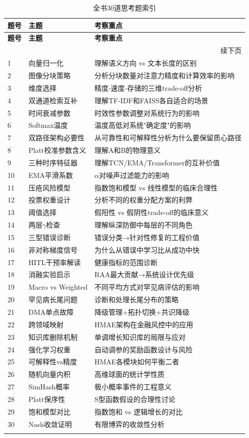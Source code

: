 \documentclass[11pt,a4paper]{ctexart}
\begin{document}
\begin{longtable}{p{1.5cm}p{6cm}p{6.5cm}}
\toprule
\textbf{题号} & \textbf{主题} & \textbf{考察重点} \\
\midrule
\endfirsthead
\midrule
\textbf{题号} & \textbf{主题} & \textbf{考察重点} \\
\midrule
\endhead
\midrule
\multicolumn{3}{r}{\small 续下页} \\
\endfoot
\bottomrule
\endlastfoot

1 & 向量归一化 & 理解语义方向 vs 文本长度的区别 \\
2 & 图像分块策略 & 分析分块数量对注意力精度和计算效率的影响 \\
3 & 维度选择 & 精度-速度-存储的三维trade-off分析 \\
4 & 双通道检索互补 & 理解TF-IDF和FAISS各自适合的场景 \\
5 & 时间衰减参数 & 时效性参数调整对系统行为的影响 \\
6 & Softmax温度 & 温度高低对系统"确定度"的影响 \\
7 & 双路径架构必要性 & 从可靠性和可解释性分析为什么要保留质心路径 \\
8 & Platt校准参数含义 & 理解A和B的物理意义 \\
9 & 三种时序特征器 & 理解TCN/EMA/Transformer的互补价值 \\
10 & EMA平滑系数 & $\alpha$对噪声过滤能力的影响 \\
11 & 压疮风险模型 & 指数饱和模型 vs 线性模型的临床合理性 \\
12 & 投票权重设计 & 分析不同的权重分配方案的利弊 \\
13 & 阈值选择 & 假阳性 vs 假阴性trade-off的临床意义 \\
14 & 两层$\gamma$检查 & 理解纵深防御中每层的不同角色 \\
15 & 三型错误诊断 & 错误分类→针对性修复的工程价值 \\
16 & 非对称梯度信号 & 为什么从错误中学习比从成功中快 \\
17 & HITL干预率解读 & 健康指标的范围诊断 \\
18 & 消融实验启示 & RAA最大贡献→系统设计优先级 \\
19 & Macro vs Weighted & 不同平均方式对罕见病评估的影响 \\
20 & 罕见病长尾问题 & 诊断和处理长尾分布的策略 \\
21 & DMA单点故障 & 降级管理+拓扑切换+共识降级 \\
22 & 跨领域映射 & HMAE架构在金融风控中的应用 \\
23 & 知识库删除机制 & 单调增长知识库的局限与应对 \\
24 & 强化学习权重 & 自动调参的奖励函数设计与风险 \\
25 & 可解释性vs精度 & HMAE各模块如何平衡二者 \\
26 & 随机向量内积 & 高维球面的统计学性质 \\
27 & SimHash概率 & 极小概率事件的工程意义 \\
28 & Platt保序性 & S型函数假设的合理性讨论 \\
29 & 饱和模型对比 & 指数饱和 vs 逻辑增长的对比 \\
30 & Nash收敛证明 & 有限博弈的收敛性分析 \\
\midrule
\caption{全书30道思考题索引}
\end{longtable}
\end{document}
